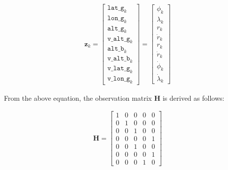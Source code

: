 \begin{align}
    \mathbf{z}_k =
    \begin{bmatrix}
        \mathtt{lat\_g}_k \\
        \mathtt{lon\_g}_k \\
        \mathtt{alt\_g}_k \\
        \mathtt{v\_alt\_g}_k \\
        \mathtt{alt\_b}_k \\
        \mathtt{v\_alt\_b}_k \\
        \mathtt{v\_lat\_g}_k \\
        \mathtt{v\_lon\_g}_k
    \end{bmatrix}
    =
    \begin{bmatrix}
        \phi_k \\
        \lambda_k \\
        r_k \\
        \dot{r}_k \\
        r_k \\
        \dot{r}_k \\
        \dot{\phi}_k \\
        \dot{\lambda}_k
    \end{bmatrix}
\end{align}

From the above equation, the observation matrix $\mathbf{H}$ is derived as follows:

\begin{align}
    \mathbf{H} =
    \begin{bmatrix}
        1 & 0 & 0 & 0 & 0 \\
        0 & 1 & 0 & 0 & 0 \\
        0 & 0 & 1 & 0 & 0 \\
        0 & 0 & 0 & 0 & 1 \\
        0 & 0 & 1 & 0 & 0 \\
        0 & 0 & 0 & 0 & 1 \\
        0 & 0 & 0 & 1 & 0
    \end{bmatrix}
\end{align}




